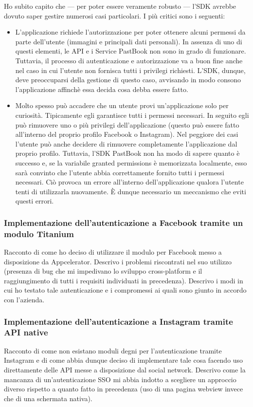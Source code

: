 				
				\noindent Ho subito capito che — per poter essere veramente robusto — l'SDK avrebbe dovuto saper gestire numerosi
				casi particolari. I più critici sono i seguenti:
				\begin{itemize}
					\item L'applicazione richiede l'autorizzazione per poter ottenere alcuni permessi da parte dell'utente
					(immagini e principali dati personali). In assenza di uno di questi elementi, le API e i Service PastBook non
					sono in grado di funzionare. Tuttavia, il processo di autenticazione e autorizzazione va a buon fine anche
					nel caso in cui l'utente non fornisca tutti i privilegi richiesti. L'SDK, dunque, deve preoccuparsi della
					gestione di questo caso, avvisando in modo consono l'applicazione affinchè essa decida cosa debba essere
					fatto.
					\item Molto spesso può accadere che un utente provi un'applicazione solo per curiosità. Tipicamente egli
					garantisce tutti i permessi necessari. In seguito egli può rimuovere uno o più privilegi dell'applicazione
					(questo può essere fatto all'interno del proprio profilo Facebook o Instagram). Nel peggiore dei casi
					l'utente può anche decidere di rimuovere completamente l'applicazione dal proprio profilo. 
					Tuttavia, l'SDK PastBook non ha modo di sapere quanto è successo e, se la variabile granted permissions è
					memorizzata localmente, esso sarà convinto che l'utente abbia correttamente fornito tutti i permessi
					necessari. Ciò provoca un errore all'interno dell'applicazione qualora l'utente tenti di utilizzarla
					nuovamente. È dunque necessario un meccanismo che eviti questi errori.
				\end{itemize}
			\subsubsection{Implementazione dell'autenticazione a Facebook tramite un modulo Titanium}
				Racconto di come ho deciso di utilizzare il modulo per Facebook messo a disposizione da Appcelerator. Descrivo i
				problemi riscontrati nel suo utilizzo (presenza di bug che mi impedivano lo sviluppo cross-platform e il
				raggiungimento di tutti i requisiti individuati in precedenza). Descrivo i modi in cui ho testato tale autenticazione
				e i compromessi ai quali sono giunto in accordo con l'azienda.
			\subsubsection{Implementazione dell'autenticazione a Instagram tramite API native}
				Racconto di come non esistano moduli degni per l'autenticazione tramite Instagram e di come abbia dunque deciso di
				implementare tale cosa facendo uso direttamente delle API messe a disposizione dal social network. Descrivo come la
				mancanza di un'autenticazione SSO mi abbia indotto a scegliere un approccio diverso rispetto a quanto fatto in
				precedenza (uso di una pagina webview invece che di una schermata nativa).

